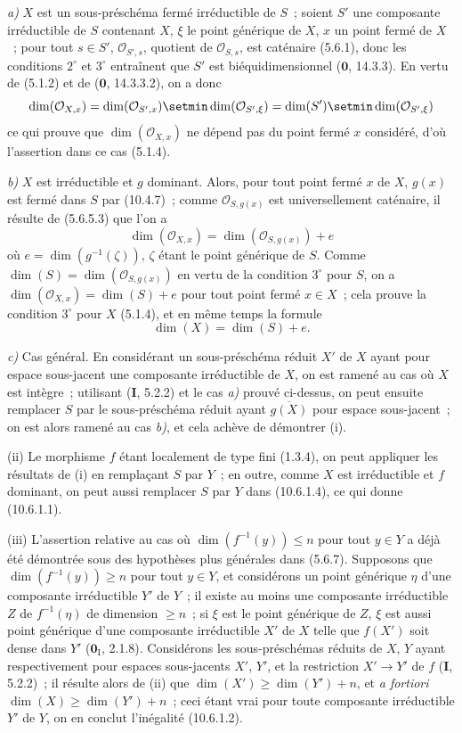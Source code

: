 \emph{a)} $X$ est un sous-préschéma fermé irréductible de $S$~; soient $S'$ une
composante irréductible de $S$ contenant $X$, $\xi$ le point générique de $X$,
$x$ un point fermé de $X$~; pour tout $s\in S'$, $\mathcal O_{S',s}$, quotient de
$\mathcal O_{S,s}$, est caténaire (5.6.1), donc les conditions $2^\circ$ et $3^\circ$
entraînent que $S'$ est biéquidimensionnel ($\mathbf 0$, 14.3.3). En vertu de
(5.1.2) et de ($\mathbf 0$, 14.3.3.2), on a donc
\[
  \dim(\mathcal O_{X,x})=\dim(\mathcal O_{S',x})\setmin\dim(\mathcal O_{S',\xi})
  =\dim(S')\setmin\dim(\mathcal O_{S',\xi})
\]
ce qui prouve que $\dim(\mathcal O_{X,x})$ ne dépend pas du point fermé $x$
considéré, d'où l'assertion dans ce cas (5.1.4).

\emph{b)} $X$ est irréductible et $g$ dominant. Alors, pour tout point fermé $x$
de $X$, $g(x)$ est fermé dans $S$ par (10.4.7)~; comme $\mathcal O_{S,g(x)}$ est
universellement caténaire, il résulte de (5.6.5.3) que l'on a
\[
  \dim(\mathcal O_{X,x})=\dim(\mathcal O_{S,g(x)})+e
\]
où $e=\dim(g^{-1}(\zeta))$, $\zeta$ étant le point générique de $S$. Comme
$\dim(S)=\dim(\mathcal O_{S,g(x)})$ en vertu de la condition $3^\circ$ pour $S$, on
a $\dim(\mathcal O_{X,x})=\dim(S)+e$ pour tout point fermé $x\in X$~; cela prouve
la condition $3^\circ$ pour $X$ (5.1.4), et en même temps la formule
\begin{equation}
\label{IV.10.6.1.4-fr}
\tag{10.6.1.4}
\dim(X)=\dim(S)+e.
\end{equation}

\emph{c)} Cas général. En considérant un sous-préschéma réduit $X'$ de $X$ ayant
pour espace sous-jacent une composante irréductible de $X$, on est ramené au cas
où $X$ est intègre~; utilisant (\textbf{I}, 5.2.2) et le cas \emph{a)} prouvé
ci-dessus, on peut ensuite remplacer $S$ par le sous-préschéma réduit ayant
$\overline{g(X)}$ pour espace sous-jacent~; on est alors ramené au cas \emph{b)},
et cela achève de démontrer (i).

(ii) Le morphisme $f$ étant localement de type fini (1.3.4), on peut
appliquer les résultats de (i) en remplaçant $S$ par $Y$~; en outre, comme $X$
est irréductible et $f$ dominant, on peut aussi remplacer $S$ par $Y$ dans
(10.6.1.4), ce qui donne (10.6.1.1).

(iii) L'assertion relative au cas où $\dim(f^{-1}(y))\leq n$ pour tout $y\in Y$
a déjà été démontrée sous des hypothèses plus générales dans (5.6.7). Supposons
que $\dim(f^{-1}(y))\geq n$ pour tout $y\in Y$, et considérons un point générique
$\eta$ d'une composante irréductible $Y'$ de $Y$~; il existe au moins une
composante irréductible $Z$ de $f^{-1}(\eta)$ de dimension $\geq n$~; si $\xi$
est le point générique de $Z$, $\xi$ est aussi point générique d'une composante
irréductible $X'$ de $X$ telle que $f(X')$ soit dense dans $Y'$ ($\mathbf 0_{\mathrm I}$,
2.1.8). Considérons les sous-préschémas réduits de $X$, $Y$ ayant respectivement
pour espaces sous-jacents $X'$, $Y'$, et la restriction $X'\to Y'$ de $f$
(\textbf{I}, 5.2.2)~; il résulte alors de (ii) que
$\dim(X')\geq\dim(Y')+n$, et \emph{a fortiori} $\dim(X)\geq\dim(Y')+n$~; ceci étant vrai
pour toute composante irréductible $Y'$ de $Y$, on en conclut l'inégalité
(10.6.1.2).

